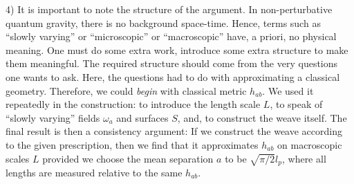 \item{4)} {It is important to note the structure of the argument. In
non-perturbative quantum gravity, there is no background space-time. Hence,
terms such as  ``slowly varying'' or  ``microscopic'' or ``macroscopic'' have,
a priori, no physical meaning. One must do some extra work, introduce some
extra structure to make them meaningful. The required structure
should come from the very questions one wants to ask. Here, the questions had
to do with approximating a classical geometry. Therefore, we could {\it begin}
with classical metric $h_{ab}$. We used it repeatedly in the construction: to
introduce the length scale $L$, to speak of ``slowly varying'' fields
$\omega_a$ and surfaces $S$, and, to construct the weave itself. The final
result is then a consistency argument: If we construct the weave according to
the given prescription, then we find that it approximates $h_{ab}$ on
macroscopic scales $L$ provided we choose the mean separation $a$ to be
$\sqrt{\pi/2} l_p$, where all lengths are measured relative to the same
$h_{ab}$.}
